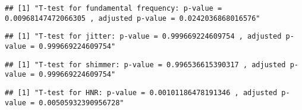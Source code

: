 \documentclass[
]{article}
\newenvironment{Shaded}{\begin{snugshade}}{\end{snugshade}}
\newcommand{\DecValTok}[1]{\textcolor[rgb]{0.00,0.00,0.81}{#1}}
\newcommand{\FunctionTok}[1]{\textcolor[rgb]{0.00,0.00,0.00}{#1}}
\newcommand{\NormalTok}[1]{#1}
\newcommand{\SpecialCharTok}[1]{\textcolor[rgb]{0.00,0.00,0.00}{#1}}
\newcommand{\StringTok}[1]{\textcolor[rgb]{0.31,0.60,0.02}{#1}}
\begin{document}
\begin{verbatim}
## [1] "T-test for fundamental frequency: p-value = 0.00968147472066305 , adjusted p-value = 0.0242036868016576"
\end{verbatim}

\begin{Shaded}
\end{Shaded}

\begin{verbatim}
## [1] "T-test for jitter: p-value = 0.999669224609754 , adjusted p-value = 0.999669224609754"
\end{verbatim}

\begin{Shaded}
\end{Shaded}

\begin{verbatim}
## [1] "T-test for shimmer: p-value = 0.996536615390317 , adjusted p-value = 0.999669224609754"
\end{verbatim}

\begin{Shaded}
\end{Shaded}

\begin{verbatim}
## [1] "T-test for HNR: p-value = 0.00101186478191346 , adjusted p-value = 0.00505932390956728"
\end{verbatim}
\end{document}
